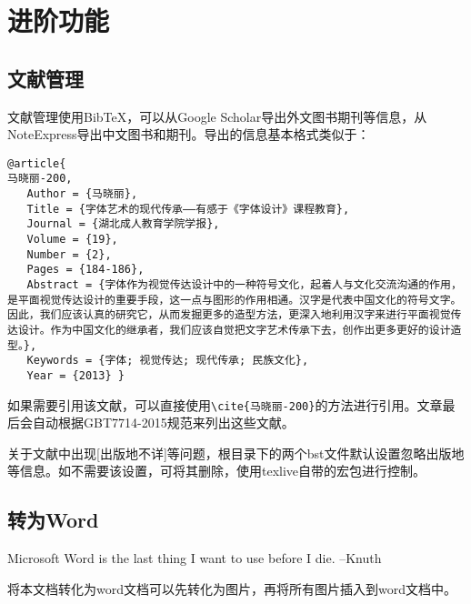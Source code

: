 \section{进阶功能}
\subsection{文献管理}
文献管理使用Bib\TeX ，可以从Google Scholar导出外文图书期刊等信息，从NoteExpress导出中文图书和期刊\cite{刘运来-199}。导出的信息基本格式类似于：
\begin{verbatim}
@article{
马晓丽-200,
   Author = {马晓丽},
   Title = {字体艺术的现代传承——有感于《字体设计》课程教育},
   Journal = {湖北成人教育学院学报},
   Volume = {19},
   Number = {2},
   Pages = {184-186},
   Abstract = {字体作为视觉传达设计中的一种符号文化，起着人与文化交流沟通的作用，是平面视觉传达设计的重要手段，这一点与图形的作用相通。汉字是代表中国文化的符号文字。因此，我们应该认真的研究它，从而发掘更多的造型方法，更深入地利用汉字来进行平面视觉传达设计。作为中国文化的继承者，我们应该自觉把文字艺术传承下去，创作出更多更好的设计造型。},
   Keywords = {字体; 视觉传达; 现代传承; 民族文化},
   Year = {2013} }
\end{verbatim}
如果需要引用该文献，可以直接使用\verb|\cite{马晓丽-200}|的方法进行引用。文章最后会自动根据GBT7714-2015规范来列出这些文献。

关于文献中出现[出版地不详]等问题，根目录下的两个bst文件默认设置忽略出版地等信息。如不需要该设置，可将其删除，使用texlive自带的宏包进行控制。
\subsection{转为Word}
Microsoft Word is the last thing I want to use before I die.
--Knuth

将本文档转化为word文档可以先转化为图片，再将所有图片插入到word文档中。